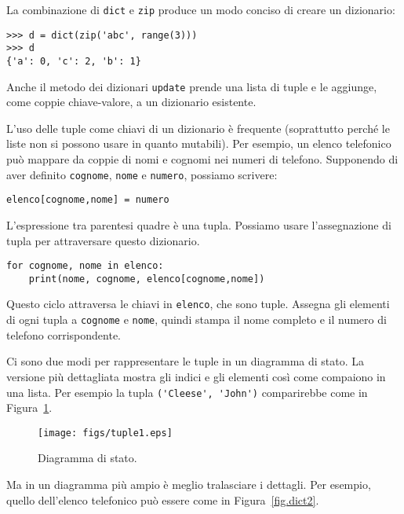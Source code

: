 \documentclass[10pt]{book}
\begin{document}
La combinazione di {\tt dict} e {\tt zip} produce un modo conciso di creare un dizionario:

\begin{verbatim}
>>> d = dict(zip('abc', range(3)))
>>> d
{'a': 0, 'c': 2, 'b': 1}
\end{verbatim}
%
Anche il metodo dei dizionari {\tt update} prende una lista di tuple e le aggiunge, come coppie chiave-valore, a un dizionario esistente.

L'uso delle tuple come chiavi di un dizionario è frequente (soprattutto perché le liste non si possono usare in quanto mutabili). Per esempio, un elenco telefonico può mappare da coppie di nomi e cognomi nei numeri di telefono. Supponendo di aver definito {\tt cognome}, {\tt nome} e {\tt numero}, possiamo scrivere:

\begin{verbatim}
elenco[cognome,nome] = numero
\end{verbatim}
%
L'espressione tra parentesi quadre è una tupla. Possiamo usare l'assegnazione di tupla per attraversare questo dizionario.

\begin{verbatim}
for cognome, nome in elenco:
    print(nome, cognome, elenco[cognome,nome])
\end{verbatim}
%
Questo ciclo attraversa le chiavi in {\tt elenco}, che sono tuple. Assegna gli elementi di ogni tupla a {\tt cognome} e {\tt nome}, quindi stampa il nome completo e il numero di telefono corrispondente.

Ci sono due modi per rappresentare le tuple in un diagramma di stato. La versione più dettagliata mostra gli indici e gli elementi così come compaiono in una lista. Per esempio la tupla \verb"('Cleese', 'John')" comparirebbe come in Figura~\ref{fig.tuple1}.

\begin{figure}
\centerline
{\texttt{[image: figs/tuple1.eps]}}
\caption{Diagramma di stato.}
\label{fig.tuple1}
\end{figure}

Ma in un diagramma più ampio è meglio tralasciare i dettagli. Per esempio, quello dell'elenco telefonico può essere come in Figura~\ref{fig.dict2}.
\end{document}
